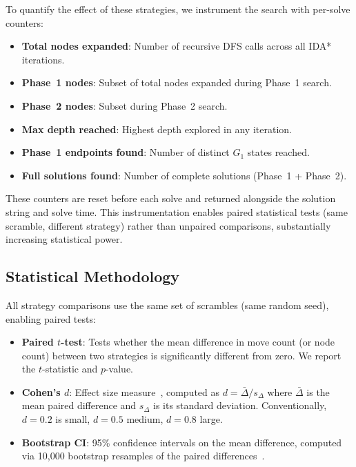 \documentclass[conference]{IEEEtran}
\begin{document}
To quantify the effect of these strategies, we instrument the search with per-solve counters:
\begin{itemize}[leftmargin=*]
  \item \textbf{Total nodes expanded}: Number of recursive DFS calls across all IDA* iterations.
  \item \textbf{Phase~1 nodes}: Subset of total nodes expanded during Phase~1 search.
  \item \textbf{Phase~2 nodes}: Subset during Phase~2 search.
  \item \textbf{Max depth reached}: Highest depth explored in any iteration.
  \item \textbf{Phase~1 endpoints found}: Number of distinct $G_1$ states reached.
  \item \textbf{Full solutions found}: Number of complete solutions (Phase~1 + Phase~2).
\end{itemize}

These counters are reset before each solve and returned alongside the solution string and solve time. This instrumentation enables paired statistical tests (same scramble, different strategy) rather than unpaired comparisons, substantially increasing statistical power.

\subsection{Statistical Methodology}
\label{sec:stats}

All strategy comparisons use the same set of scrambles (same random seed), enabling paired tests:
\begin{itemize}[leftmargin=*]
  \item \textbf{Paired $t$-test}: Tests whether the mean difference in move count (or node count) between two strategies is significantly different from zero. We report the $t$-statistic and $p$-value.
  \item \textbf{Cohen's $d$}: Effect size measure~\cite{cohen1988}, computed as $d = \bar{\Delta} / s_\Delta$ where $\bar{\Delta}$ is the mean paired difference and $s_\Delta$ is its standard deviation. Conventionally, $d = 0.2$ is small, $d = 0.5$ medium, $d = 0.8$ large.
  \item \textbf{Bootstrap CI}: 95\% confidence intervals on the mean difference, computed via 10,000 bootstrap resamples of the paired differences~\cite{efron1993}.
\end{itemize}
\end{document}
